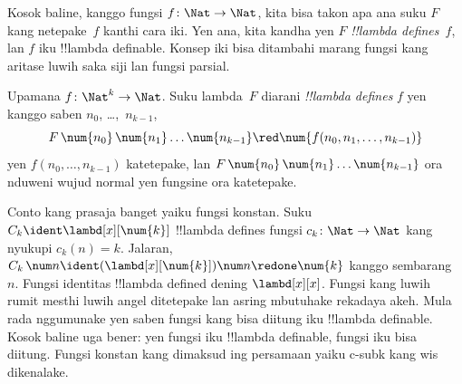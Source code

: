 \documentclass[../../../include/open-logic-section]{subfiles}
\begin{document}
Kosok baline, kanggo
fungsi $f\colon \Nat \to \Nat$,
kita bisa takon apa ana
suku $F$ kang netepake~$f$
kanthi cara iki.
Yen ana, kita kandha
yen $F$ \emph{!!{lambda define}s}~$f$,
lan $f$ iku
!!{lambda definable}.
Konsep iki bisa ditambahi
marang fungsi kang aritase
luwih saka siji lan fungsi
parsial.

\begin{defn}
Upamana $f\colon \Nat^k \to \Nat$.
Suku lambda~$F$ diarani
\emph{!!{lambda define}s}
$f$ yen kanggo saben
$n_0$, \dots,~$n_{k-1}$,
\[
F \, \num{n_0} \, \num{n_1} \dots \num{n_{k-1}} \red \num{f(n_0, n_1, \dots,
  n_{k-1})}
\]
yen $f(n_0, \dots, n_{k-1})$
katetepake, lan
$F \, \num{n_0} \,
\num{n_1} \dots \num{n_{k-1}}$
ora nduweni wujud normal
yen fungsine ora katetepake.
\end{defn}

Conto kang prasaja banget
yaiku fungsi konstan.
Suku $C_k \ident
\lambd[x][\num{k}]$
!!{lambda define}s
fungsi $c_k\colon \Nat \to
\Nat$ kang nyukupi
$c_k(n) = k$.
Jalaran, $C_k \, \num n \ident
(\lambd[x][\num{k}])\num n
\redone \num{k}$
kanggo sembarang~$n$.
Fungsi identitas
!!{lambda defined}
dening $\lambd[x][x]$.
Fungsi kang luwih rumit
mesthi luwih angel
ditetepake lan asring
mbutuhake rekadaya akeh.
Mula rada nggumunake yen
saben fungsi kang bisa
diitung iku
!!{lambda definable}.
Kosok baline uga bener:
yen fungsi iku
!!{lambda definable},
fungsi iku bisa diitung. Fungsi konstan kang dimaksud ing persamaan yaiku c-subk kang wis dikenalake.
\end{document}
